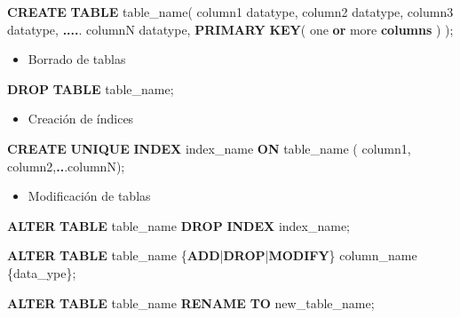 \documentclass[
]{book}
\newenvironment{Shaded}{\begin{snugshade}}{\end{snugshade}}
\newcommand{\KeywordTok}[1]{\textcolor[rgb]{0.13,0.29,0.53}{\textbf{#1}}}
\newcommand{\NormalTok}[1]{#1}
\newcommand{\OperatorTok}[1]{\textcolor[rgb]{0.81,0.36,0.00}{\textbf{#1}}}
\providecommand{\tightlist}{%
  \setlength{\itemsep}{0pt}\setlength{\parskip}{0pt}}
\begin{document}
\begin{Shaded}
\begin{Highlighting}[]
\KeywordTok{CREATE} \KeywordTok{TABLE}\NormalTok{ table\_name(}
\NormalTok{column1 datatype,}
\NormalTok{column2 datatype,}
\NormalTok{column3 datatype,}
\OperatorTok{....}\NormalTok{.}
\NormalTok{columnN datatype,}
\KeywordTok{PRIMARY} \KeywordTok{KEY}\NormalTok{( one }\KeywordTok{or}\NormalTok{ more }\KeywordTok{columns}\NormalTok{ )}
\NormalTok{);}
\end{Highlighting}
\end{Shaded}

\begin{itemize}
\tightlist
\item
  Borrado de tablas
\end{itemize}

\begin{Shaded}
\begin{Highlighting}[]
\KeywordTok{DROP} \KeywordTok{TABLE}\NormalTok{ table\_name;}
\end{Highlighting}
\end{Shaded}

\begin{itemize}
\tightlist
\item
  Creación de índices
\end{itemize}

\begin{Shaded}
\begin{Highlighting}[]
\KeywordTok{CREATE} \KeywordTok{UNIQUE} \KeywordTok{INDEX}\NormalTok{ index\_name}
\KeywordTok{ON}\NormalTok{ table\_name ( column1, column2,}\OperatorTok{..}\NormalTok{.columnN);}
\end{Highlighting}
\end{Shaded}

\begin{itemize}
\tightlist
\item
  Modificación de tablas
\end{itemize}

\begin{Shaded}
\begin{Highlighting}[]
\KeywordTok{ALTER} \KeywordTok{TABLE}\NormalTok{ table\_name}
\KeywordTok{DROP} \KeywordTok{INDEX}\NormalTok{ index\_name;}

\KeywordTok{ALTER} \KeywordTok{TABLE}\NormalTok{ table\_name}
\NormalTok{\{}\KeywordTok{ADD}\NormalTok{|}\KeywordTok{DROP}\NormalTok{|}\KeywordTok{MODIFY}\NormalTok{\} column\_name \{data\_ype\};}

\KeywordTok{ALTER} \KeywordTok{TABLE}\NormalTok{ table\_name }\KeywordTok{RENAME} \KeywordTok{TO}\NormalTok{ new\_table\_name;}
\end{Highlighting}
\end{Shaded}
\end{document}
